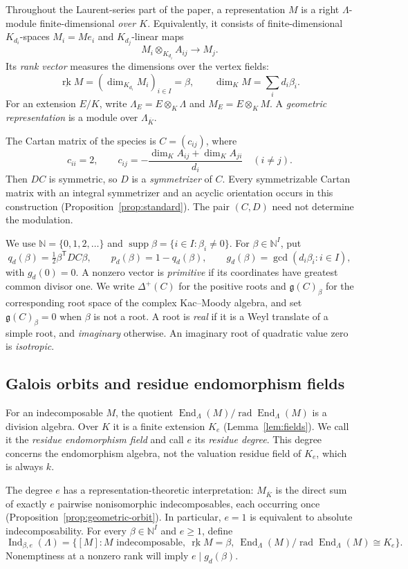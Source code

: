 \documentclass[11pt, reqno]{amsart}
\numberwithin{equation}{section}
\theoremstyle{definition}
\theoremstyle{remark}
\newcommand{\op}[1]{\operatorname{#1}}
\newcommand{\mb}[1]{\mathbb{#1}}
\newcommand{\Ind}{\op{Ind}}
\newcommand{\rk}{\underline{\op{rk}}}
\newcommand{\End}{\op{End}}
\newcommand{\rad}{\op{rad}}
\newcommand{\supp}{\op{supp}}
\newcommand{\Kbar}{\overline K}
\newcommand{\iso}{\cong}
\begin{document}
Throughout the Laurent-series part of the paper, a representation $M$
is a right $\Lambda$-module finite-dimensional \emph{over $K$}.
Equivalently, it consists of finite-dimensional $K_{d_i}$-spaces
$M_i=Me_i$ and $K_{d_j}$-linear maps
\[ M_i\otimes_{K_{d_i}}A_{ij}\longrightarrow M_j. \]
Its \emph{rank vector} measures the dimensions over the vertex fields:
\[ \rk M=(\dim_{K_{d_i}}M_i)_{i\in I}=\beta,\qquad \dim_K M=\sum_i d_i\beta_i. \]
For an extension $E/K$, write $\Lambda_E=E\otimes_K\Lambda$ and
$M_E=E\otimes_K M$. A \emph{geometric representation} is a module over
$\Lambda_{\Kbar}$.

The Cartan matrix of the species is $C=(c_{ij})$, where
\[ c_{ii}=2,\qquad c_{ij}=-\frac{\dim_K A_{ij}+\dim_K A_{ji}}{d_i}\quad(i\ne j). \]
Then $DC$ is symmetric, so $D$ is a \emph{symmetrizer} of $C$.
Every symmetrizable Cartan matrix with an integral symmetrizer and an
acyclic orientation occurs in this construction
(Proposition~\ref{prop:standard}). The pair $(C,D)$ need not determine
the modulation.

We use $\mb N=\{0,1,2,\ldots\}$ and
$\supp\beta=\{i\in I:\beta_i\ne0\}$. For $\beta\in\mb N^I$, put
\[ q_d(\beta)=\tfrac12\beta^{\mathsf T}DC\beta,\qquad p_d(\beta)=1-q_d(\beta),\qquad g_d(\beta)=\gcd(d_i\beta_i:i\in I), \]
with $g_d(0)=0$. A nonzero vector is \emph{primitive} if its coordinates
have greatest common divisor one. We write $\Delta^+(C)$ for the
positive roots and $\mathfrak g(C)_\beta$ for the corresponding root
space of the complex Kac--Moody algebra, and set
$\mathfrak g(C)_\beta=0$ when $\beta$ is not a root. A root is \emph{real} if it is a Weyl translate of a
simple root, and \emph{imaginary} otherwise. An imaginary root of
quadratic value zero is \emph{isotropic}.

\subsection*{Galois orbits and residue endomorphism fields}
For an indecomposable $M$, the quotient
$\End_\Lambda(M)/\rad\End_\Lambda(M)$ is a division algebra. Over $K$
it is a finite extension $K_e$ (Lemma~\ref{lem:fields}). We call it the
\emph{residue endomorphism field} and call $e$ its \emph{residue degree}.
This degree concerns the endomorphism algebra, not the valuation residue field of $K_e$, which
is always $k$.

The degree $e$ has a representation-theoretic interpretation:
$M_{\Kbar}$ is the direct sum of exactly $e$ pairwise nonisomorphic
indecomposables, each occurring once
(Proposition~\ref{prop:geometric-orbit}). In particular, $e=1$ is
equivalent to absolute indecomposability. For every $\beta\in\mb N^I$
and $e\ge1$, define
\[ \Ind_{\beta,e}(\Lambda)=\{[M]:M\text{ indecomposable},\ \rk M=\beta,\ \End_\Lambda(M)/\rad\End_\Lambda(M)\iso K_e\}. \]
Nonemptiness at a nonzero rank will imply $e\mid g_d(\beta)$.
\end{document}

